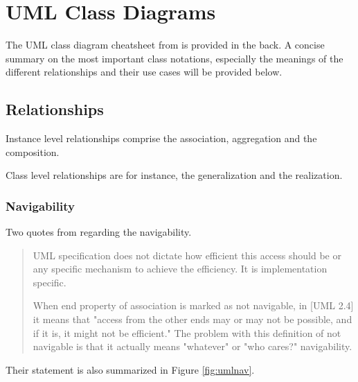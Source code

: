 \documentclass[../main/main.tex]{subfiles}
\begin{document}
\section{UML Class Diagrams}

The UML class diagram cheatsheet from \cite{oose:uml} is provided in the back.
A concise summary on the most important class notations, especially the
meanings of the different relationships and their use cases will be provided
below. 

\subsection{Relationships}

Instance level relationships comprise the association, aggregation and the
composition. 

Class level relationships are for instance, the generalization and the
realization. 

\subsubsection{Navigability}

Two quotes from \cite{umldiagrams:navigability} regarding the navigability. 

\begin{quote}
UML specification does not dictate how efficient this access should be or any
specific mechanism to achieve the efficiency. It is implementation specific.

When end property of association is marked as not navigable, in [UML 2.4] it
means that "access from the other ends may or may not be possible, and if it is,
it might not be efficient." The problem with this definition of not navigable is
that it actually means "whatever" or "who cares?" navigability.

\end{quote}

Their statement is also summarized in Figure \ref{fig:umlnav}.
\end{document}

